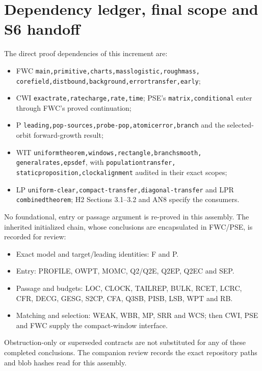 \documentclass[11pt]{article}
\numberwithin{equation}{section}
\begin{document}
\section{Dependency ledger, final scope and S6 handoff}
\label{an07rtav1:handoff}
The direct proof dependencies of this increment are:
\begin{itemize}\raggedright
\item FWC \texttt{main,\allowbreak primitive,\allowbreak charts,\allowbreak masslogistic,\allowbreak roughmass,\allowbreak 
corefield,\allowbreak distbound,\allowbreak background,\allowbreak errortransfer,\allowbreak early};
\item CWI \texttt{exactrate,\allowbreak ratecharge,\allowbreak rate,\allowbreak time}; PSE's
\texttt{matrix,\allowbreak conditional} enter through FWC's proved continuation;
\item P \texttt{leading,\allowbreak pop-sources,\allowbreak probe-pop,\allowbreak atomicerror,\allowbreak branch}
and the selected-orbit forward-growth result;
\item WIT \texttt{uniformtheorem,\allowbreak windows,\allowbreak rectangle,\allowbreak branchsmooth,\allowbreak 
generalrates,\allowbreak epsdef}, with \texttt{populationtransfer,\allowbreak 
staticproposition,\allowbreak clockalignment} audited in their exact scopes;
\item LP \texttt{uniform-clear,\allowbreak compact-transfer,\allowbreak diagonal-transfer}
and LPR \texttt{combinedtheorem}; H2 Sections 3.1--3.2 and AN8
specify the consumers.
\end{itemize}
No foundational, entry or passage argument is re-proved in this
assembly. The inherited initialized chain, whose conclusions are
encapsulated in FWC/PSE, is recorded for review:
\begin{itemize}
\item Exact model and target/leading identities: F and P.
\item Entry: PROFILE, OWPT, MOMC, Q2/Q2E, Q2EP, Q2EC and SEP.
\item Passage and budgets: LOC, CLOCK, TAILREP, BULK, RCET, LCRC,
CFR, DECG, GESG, S2CP, CFA, Q3SB, PISB, LSB, WPT and RB.
\item Matching and selection: WEAK, WBR, MP, SRR and WCS;
then CWI, PSE and FWC supply the compact-window interface.
\end{itemize}
Obstruction-only or superseded contracts are not substituted for
any of these completed conclusions. The companion review records
the exact repository paths and blob hashes read for this assembly.
\end{document}
